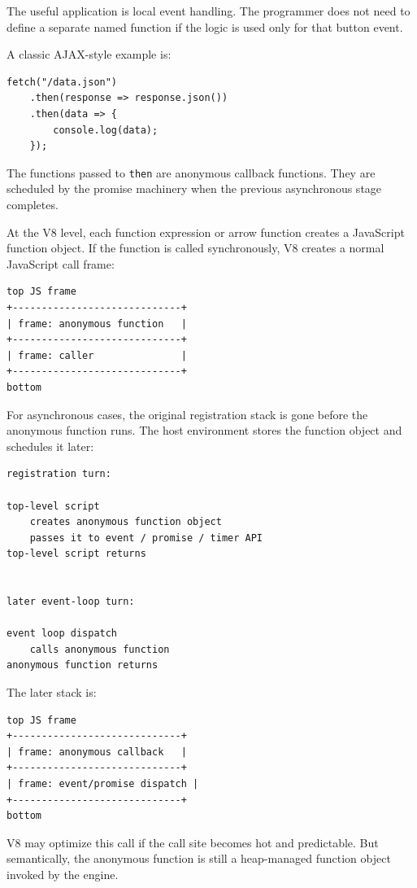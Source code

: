 \documentclass[a4paper,twoside]{report}
\begin{document}
The useful application is local event handling. The programmer does not need to define a separate named function if the logic is used only for that button event.

A classic AJAX-style example is:

\begin{verbatim}
fetch("/data.json")
    .then(response => response.json())
    .then(data => {
        console.log(data);
    });
\end{verbatim}

The functions passed to \texttt{then} are anonymous callback functions. They are scheduled by the promise machinery when the previous asynchronous stage completes.

At the V8 level, each function expression or arrow function creates a JavaScript function object. If the function is called synchronously, V8 creates a normal JavaScript call frame:

\begin{verbatim}
top JS frame
+-----------------------------+
| frame: anonymous function   |
+-----------------------------+
| frame: caller               |
+-----------------------------+
bottom
\end{verbatim}

For asynchronous cases, the original registration stack is gone before the anonymous function runs. The host environment stores the function object and schedules it later:

\begin{verbatim}
registration turn:

top-level script
    creates anonymous function object
    passes it to event / promise / timer API
top-level script returns


later event-loop turn:

event loop dispatch
    calls anonymous function
anonymous function returns
\end{verbatim}

The later stack is:

\begin{verbatim}
top JS frame
+-----------------------------+
| frame: anonymous callback   |
+-----------------------------+
| frame: event/promise dispatch |
+-----------------------------+
bottom
\end{verbatim}

V8 may optimize this call if the call site becomes hot and predictable. But semantically, the anonymous function is still a heap-managed function object invoked by the engine.
\end{document}
